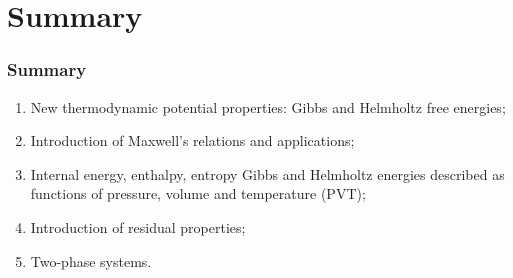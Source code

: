 \documentclass[10pt,compress,handout,unknownkeysallowed]{beamer}
\begin{document}

\section{Summary}

\begin{frame}
 \frametitle{Summary}
   \begin{enumerate}[1.]
     \item New thermodynamic potential properties: Gibbs and Helmholtz free energies;
     \item Introduction of Maxwell's relations and applications;
     \item Internal energy, enthalpy, entropy Gibbs and Helmholtz energies described as functions of pressure, volume and temperature (PVT);
     \item Introduction of residual properties;
     \item Two-phase systems.
   \end{enumerate}
\end{frame}
\end{document}
